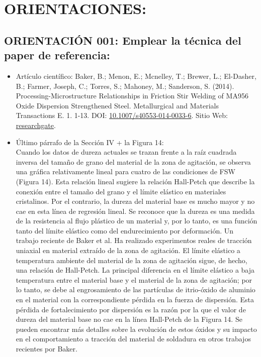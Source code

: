 \documentclass[12pt,a4paper]{article}
\begin{document}
\section{ORIENTACIONES:}

    \subsection{ORIENTACIÓN 001: Emplear la técnica del paper de referencia:}
    \begin{itemize}
        \item Artículo científico:  Baker, B.; Menon, E.; Mcnelley, T.; Brewer, L.; El-Dasher, B.; Farmer, Joseph, C.; Torres, S.; Mahoney, M.; Sanderson, S. (2014). Processing-Microstructure Relationships in Friction Stir Welding of MA956 Oxide Dispersion Strengthened Steel. Metallurgical and Materials Transactions E. 1. 1-13. DOI: \href{http://dx.doi.org/10.1007/s40553-014-0033-6}{10.1007/s40553-014-0033-6}. Sitio Web: \href{https://www.researchgate.net/publication/305807425_Processing-Microstructure_Relationships_in_Friction_Stir_Welding_of_MA956_Oxide_Dispersion_Strengthened_Steel#fullTextFileContent}{researchgate}.
        \item Último párrafo de la Sección IV + la Figura 14:\\
        Cuando los datos de dureza actuales se trazan frente a la raíz cuadrada inversa del tamaño de grano del material de la zona de agitación, se observa una gráfica relativamente lineal para cuatro de las condiciones de FSW (Figura 14). Esta relación lineal sugiere la relación Hall-Petch que describe la conexión entre el tamaño del grano y el límite elástico en materiales cristalinos. Por el contrario, la dureza del material base es mucho mayor y no cae en esta línea de regresión lineal. Se reconoce que la dureza es una medida de la resistencia al flujo plástico de un material y, por lo tanto, es una función tanto del límite elástico como del endurecimiento por deformación. Un trabajo reciente de Baker et al. Ha realizado experimentos reales de tracción uniaxial en material extraído de la zona de agitación. El límite elástico a temperatura ambiente del material de la zona de agitación sigue, de hecho, una relación de Hall-Petch. La principal diferencia en el límite elástico a baja temperatura entre el material base y el material de la zona de agitación; por lo tanto, se debe al engrosamiento de las partículas de itrio-óxido de aluminio en el material con la correspondiente pérdida en la fuerza de dispersión. Esta pérdida de fortalecimiento por dispersión es la razón por la que el valor de dureza del material base no cae en la línea Hall-Petch de la Figura 14. Se pueden encontrar más detalles sobre la evolución de estos óxidos y su impacto en el comportamiento a tracción del material de soldadura en otros trabajos recientes por Baker.

\end{itemize}
\end{document}
